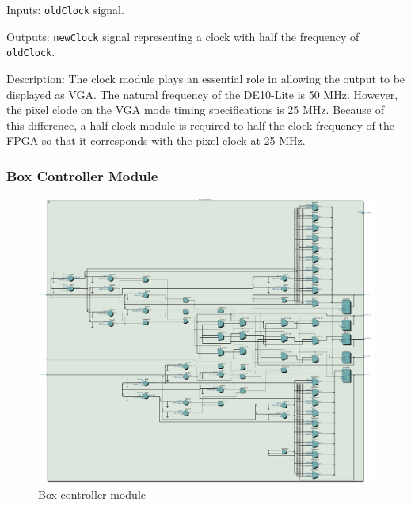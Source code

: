 \documentclass[12pt]{article}
\numberwithin{figure}{subsection}
\begin{document}
Inputs: \texttt{oldClock} signal.

Outputs: \texttt{newClock} signal representing a clock with half the frequency of \texttt{oldClock}.

Description: The clock module plays an essential role in allowing the output to be displayed as VGA. The natural frequency of the DE10-Lite is 50 MHz. However, the pixel clode on the VGA mode timing specifications is 25 MHz. Because of this difference, a half clock module is required to half the clock frequency of the FPGA so that it corresponds with the pixel clock at 25 MHz.

\newpage

\subsubsection{Box Controller Module}

\begin{figure}[ht]
  \centering
  \includegraphics[width=\textwidth]{box_controller.jpg}
  \caption{Box controller module}
  \label{fig:box_controller}
\end{figure}
\end{document}
